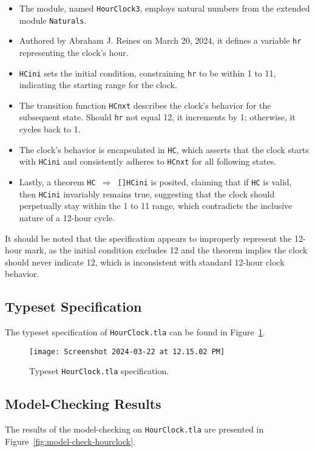 \documentclass{article}
\begin{document}
\begin{itemize}
    \item The module, named \texttt{HourClock3}, employs natural numbers from the extended module \texttt{Naturals}.
    \item Authored by Abraham J. Reines on March 20, 2024, it defines a variable \texttt{hr} representing the clock's hour.
    \item \texttt{HCini} sets the initial condition, constraining \texttt{hr} to be within 1 to 11, indicating the starting range for the clock.
    \item The transition function \texttt{HCnxt} describes the clock's behavior for the subsequent state. Should \texttt{hr} not equal 12, it increments by 1; otherwise, it cycles back to 1.
    \item The clock's behavior is encapsulated in \texttt{HC}, which asserts that the clock starts with \texttt{HCini} and consistently adheres to \texttt{HCnxt} for all following states.
    \item Lastly, a theorem \texttt{HC \(\Rightarrow\) []HCini} is posited, claiming that if \texttt{HC} is valid, then \texttt{HCini} invariably remains true, suggesting that the clock should perpetually stay within the 1 to 11 range, which contradicts the inclusive nature of a 12-hour cycle.
\end{itemize}

It should be noted that the specification appears to improperly represent the 12-hour mark, as the initial condition excludes 12 and the theorem implies the clock should never indicate 12, which is inconsistent with standard 12-hour clock behavior.

\subsection*{Typeset Specification}
The typeset specification of \texttt{HourClock.tla} can be found in Figure~\ref{fig:typeset-hourclock}.

\begin{figure}[H]
\centering
\texttt{[image: Screenshot 2024-03-22 at 12.15.02 PM]}
\caption{Typeset \texttt{HourClock.tla} specification.}
\label{fig:typeset-hourclock}
\end{figure}

\subsection*{Model-Checking Results}
The results of the model-checking on \texttt{HourClock.tla} are presented in Figure~\ref{fig:model-check-hourclock}.
\end{document}
